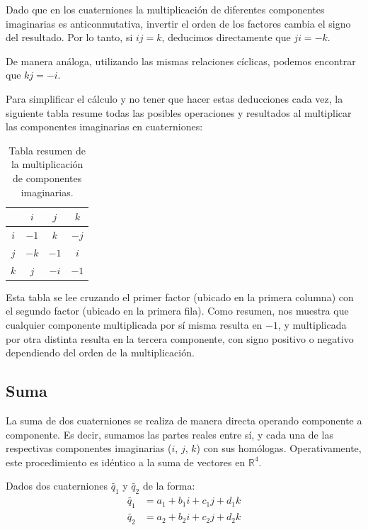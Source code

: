 Dado que en los cuaterniones la multiplicación de diferentes componentes imaginarias es anticonmutativa, invertir el orden de los factores cambia el signo del resultado. Por lo tanto, si $ij = k$, deducimos directamente que $ji = -k$. 

De manera análoga, utilizando las mismas relaciones cíclicas, podemos encontrar que $kj = -i$.

Para simplificar el cálculo y no tener que hacer estas deducciones cada vez, la siguiente tabla resume todas las posibles operaciones y resultados al multiplicar las componentes imaginarias en cuaterniones:

\begin{table}[hbt!]
    \centering
    \large
    \renewcommand{\arraystretch}{1.5}
    \begin{tabular}{|c|ccc|}
        \hline
         & $i$ & $j$ & $k$ \\
        \hline
        $i$ & $-1$ & $k$ & $-j$ \\
        $j$ & $-k$ & $-1$ & $i$ \\
        $k$ & $j$ & $-i$ & $-1$ \\
        \hline
    \end{tabular}
    \caption{Tabla resumen de la multiplicación de componentes imaginarias.}
\end{table}

Esta tabla se lee cruzando el primer factor (ubicado en la primera columna) con el segundo factor (ubicado en la primera fila). Como resumen, nos muestra que cualquier componente multiplicada por sí misma resulta en $-1$, y multiplicada por otra distinta resulta en la tercera componente, con signo positivo o negativo dependiendo del orden de la multiplicación.

\subsection{Suma}
La suma de dos cuaterniones se realiza de manera directa operando componente a componente. Es decir, sumamos las partes reales entre sí, y cada una de las respectivas componentes imaginarias ($i$, $j$, $k$) con sus homólogas. Operativamente, este procedimiento es idéntico a la suma de vectores en $\mathbb{R}^4$.

Dados dos cuaterniones $\tilde{q_1}$ y $\tilde{q_2}$ de la forma:
\begin{align*}
    \tilde{q_1} &= a_1 + b_1i + c_1j + d_1k \\
    \tilde{q_2} &= a_2 + b_2i + c_2j + d_2k
\end{align*}


